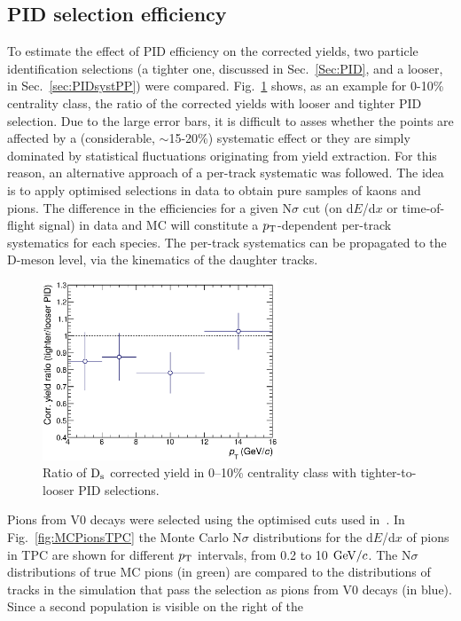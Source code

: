 \subsection{PID selection efficiency}
\label{sec:PIDsystAA}
To estimate the effect of PID efficiency on the corrected yields, 
two particle identification selections (a tighter one, discussed in Sec.~\ref{Sec:PID}, and a 
looser, in Sec.~\ref{sec:PIDsystPP}) were compared. Fig.~\ref{fig:DsPID010} 
shows, as an example for 0-10\% centrality class, the ratio of the corrected yields 
with looser and tighter PID selection. Due to the large error bars, it is difficult to asses
whether the points are affected by a (considerable, $\sim$15-20\%) systematic effect
or they are simply dominated by statistical fluctuations originating from
yield extraction. For this reason, an alternative approach of a per-track 
systematic was followed. The idea is to apply optimised selections in data to obtain
pure samples of kaons and pions. The difference in the efficiencies for a given N$\sigma$ cut (on d$E$/d$x$ or 
time-of-flight signal) in data and MC will
constitute a $p_{\rm T}$-dependent per-track systematics for each species.
The per-track systematics can be propagated to the D-meson level, via the kinematics of
the daughter tracks.
\begin{figure}[!h]
 \centering
 \includegraphics[angle=0, width=7cm]{./FigCap5/PIDsyst_010.eps}
 \caption{Ratio of ${\rm D_s}$ corrected yield in 0--10\% centrality class with tighter-to-looser PID selections.}
 \label{fig:DsPID010} 
\end{figure}
Pions from V0 decays were selected using the optimised cuts
used in~\cite{Schuchmann:2102194}. In Fig.~\ref{fig:MCPionsTPC} the Monte Carlo 
N$\sigma$ distributions for the d$E$/d$x$ of pions in TPC are shown for 
different $p_{\rm T}$ intervals, from 0.2 to 10 $\mathrm{GeV}/c$.
The N$\sigma$ distributions of true MC pions (in green) are compared to the
distributions of tracks in the simulation that pass the selection as pions from V0 decays 
(in blue). Since a second population is visible on the right of the 
